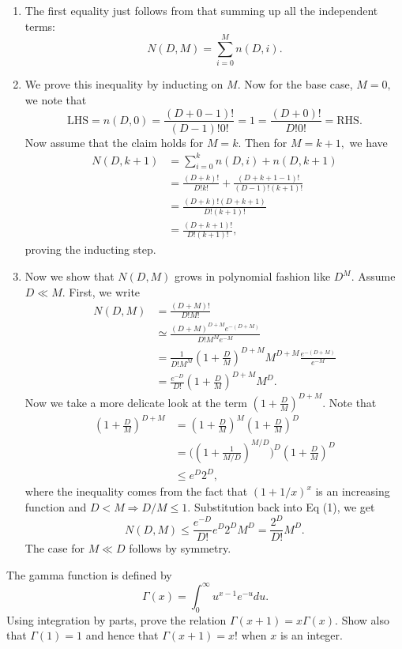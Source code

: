 \begin{enumerate}[leftmargin={*}]
\item The first equality just follows from that summing up all the independent
terms: 
\[
N(D,M)=\sum_{i=0}^{M}n(D,i).
\]
\item We prove this inequality by inducting on $M.$ Now for the base case,
$M=0,$ we note that 
\[
\text{LHS}=n(D,0)=\frac{(D+0-1)!}{(D-1)!0!}=1=\frac{(D+0)!}{D!0!}=\text{RHS}.
\]
Now assume that the claim holds for $M=k$. Then for $M=k+1,$ we
have 
\begin{align*}
N(D,k+1) & =\sum_{i=0}^{k}n(D,i)+n(D,k+1)\\
 & =\frac{(D+k)!}{D!k!}+\frac{(D+k+1-1)!}{(D-1)!(k+1)!}\\
 & =\frac{(D+k)!(D+k+1)}{D!(k+1)!}\\
 & =\frac{(D+k+1)!}{D!(k+1)!},
\end{align*}
proving the inducting step. 
\item Now we show that $N(D,M)$ grows in polynomial fashion like $D^{M}.$
Assume $D\ll M.$ First, we write 
\begin{align*}
N(D,M) & =\frac{(D+M)!}{D!M!}\\
 & \simeq\frac{(D+M)^{D+M}e^{-(D+M)}}{D!M^{M}e^{-M}}\tag{by Stirling's approximation}\\
 & =\frac{1}{D!M^{M}}\left(1+\frac{D}{M}\right)^{D+M}M^{D+M}\frac{e^{-(D+M)}}{e^{-M}}\\
 & =\frac{e^{-D}}{D!}\left(1+\frac{D}{M}\right)^{D+M}M^{D}.\tag{1}
\end{align*}
Now we take a more delicate look at the term $(1+\frac{D}{M})^{D+M}.$
Note that 
\begin{align*}
\left(1+\frac{D}{M}\right)^{D+M} & =\left(1+\frac{D}{M}\right)^{M}\left(1+\frac{D}{M}\right)^{D}\\
 & =\biggl(\left(1+\frac{1}{M/D}\right)^{M/D}\biggl)^{D}\left(1+\frac{D}{M}\right)^{D}\\
 & \leq e^{D}2^{D},
\end{align*}
where the inequality comes from the fact that $(1+1/x)^{x}$ is an
increasing function and $D<M\Rightarrow D/M\leq1.$ Substitution back
into Eq (1), we get 
\[
N(D,M)\leq\frac{e^{-D}}{D!}e^{D}2^{D}M^{D}=\frac{2^{D}}{D!}M^{D}.
\]
The case for $M\ll D$ follows by symmetry. 
\end{enumerate}
\begin{cBoxA}{}
 The gamma function is defined by 
\[
\Gamma(x)=\int_{0}^{\infty}u^{x-1}e^{-u}du.
\]
Using integration by parts, prove the relation $\Gamma(x+1)=x\Gamma(x).$
Show also that $\Gamma(1)=1$ and hence that $\Gamma(x+1)=x!$ when
$x$ is an integer. 
\end{cBoxA}

